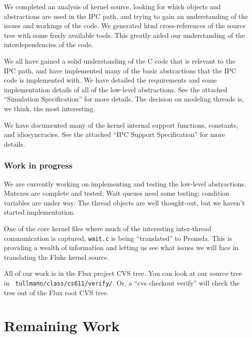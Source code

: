 We completed an analysis of kernel source, looking for which 
objects and abstractions are used in the IPC path, and trying
to gain an understanding of the issues and workings of the code.
We generated html cross-references of the source tree with some
freely available tools.  This greatly aided our understanding
of the interdependencies of the code.

We all have gained a solid understanding of the C code that
is relevant to the IPC path, and have implemented many of
the basic abstractions that the IPC code is implemented with.
We have detailed the requirements and some implementation details of
all of the low-level abstractions.  See the attached ``Simulation
Specification'' for more details.  The decision on modeling threads
is, we think, the most interesting.

We have documented many of the kernel internal support functions,
constants, and idiosyncracies.  See the attached ``IPC Support
Specification'' for more details.

\subsubsection*{Work in progress}

We are currently working on implementing and testing the low-level
abstractions.  Mutexes are complete and tested;  Wait queues need
some testing; condition variables are under way.  The thread objects
are well thought-out, but we haven't started implementation.

One of the core kernel files where much of the interesting
inter-thread communication is captured, {\tt wait.c} is being
``translated'' to Promela.  This is providing a wealth of information
and letting us see what issues we will face in translating the Fluke
kernel source.

All of our work is in the Flux project CVS tree.  You can look at
our source tree in {\tt ~tullmann/class/cs611/verify/}.   Or,
a ``cvs checkout verify'' will check the tree out of the Flux root CVS
tree.

\section*{Remaining Work}

